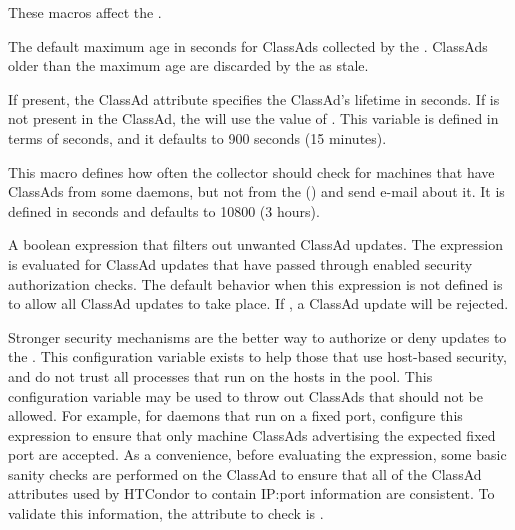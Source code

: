These macros affect the .
\begin{description}
  
\label{param:ClassadLifetime}
\item[\Macro{CLASSAD\_LIFETIME}]
  The default maximum age in seconds for ClassAds collected by the
  .  ClassAds older than the maximum age are
  discarded by the  as stale.

  If present, the ClassAd attribute  specifies the
  ClassAd's lifetime in seconds.  
  If  is not present in the ClassAd, 
  the  will use the value of
  .  
  This variable is defined in terms of seconds, 
  and it defaults to 900 seconds (15 minutes).
  
\label{param:MasterCheckInterval}
\item[\Macro{MASTER\_CHECK\_INTERVAL}]
  This macro defines how often the
  collector should check for machines that have ClassAds from some
  daemons, but not from the  ()
  and send e-mail about it.  It is defined in seconds and 
  defaults to 10800 (3 hours).

\label{param:CollectorRequirements}
\item[\Macro{COLLECTOR\_REQUIREMENTS}]
  A boolean expression that filters out unwanted ClassAd updates.  The
  expression is evaluated for ClassAd updates that have 
  passed through enabled security authorization checks.
  The default behavior when this expression is not
  defined is to allow all ClassAd updates to take place.
  If , a ClassAd update will be rejected.

  Stronger security mechanisms are the better way to
  authorize or deny updates to the .
  This configuration variable exists to help those that
  use host-based security, and
  do not trust all processes that run on the hosts in the pool.
  This configuration variable may be used to throw out ClassAds that
  should not be allowed.  For example, for
   daemons that run on a fixed port,
  configure this expression to ensure that 
  only machine ClassAds advertising the expected
  fixed port are accepted.  As a convenience, before evaluating the
  expression, some basic sanity checks are performed on the ClassAd to
  ensure that all of the ClassAd attributes used by HTCondor to contain
  IP:port information are consistent.  To validate this
  information, the attribute to check is .
 


\end{description}
